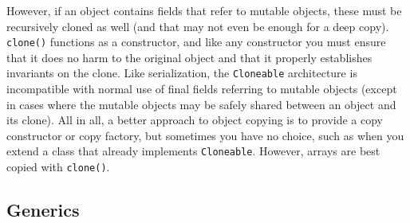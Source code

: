 \documentclass[8pt, table, xcdraw]{article}%
\begin{document}
However, if an object contains fields that refer to mutable objects, these must be recursively cloned as well (and that may not even be enough for a deep copy). \lstinline{clone()} functions as a constructor, and like any constructor you must ensure that it does no harm to the original object and that it properly establishes invariants on the clone. Like serialization, the \lstinline{Cloneable} architecture is incompatible with normal use of final fields referring to mutable objects (except in cases where the mutable objects may be safely shared between an object and its clone). All in all, a better approach to object copying is to provide a copy constructor or copy factory, but sometimes you have no choice, such as when you extend a class that already implements \lstinline{Cloneable}. However, arrays are best copied with \lstinline{clone()}.

\subsection{Generics}
\end{document}
